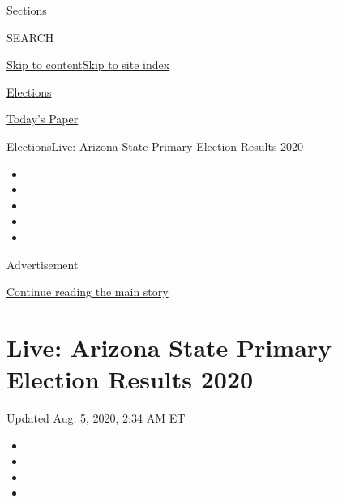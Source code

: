 Sections

SEARCH

\protect\hyperlink{site-content}{Skip to
content}\protect\hyperlink{site-index}{Skip to site index}

\href{https://www.nytimes.com/news-event/2020-election}{Elections}

\href{https://myaccount.nytimes.com/auth/login?response_type=cookie\&client_id=vi}{}

\href{https://www.nytimes.com/section/todayspaper}{Today's Paper}

\href{/news-event/2020-election}{Elections}\textbar{}Live: Arizona State
Primary Election Results 2020

\begin{itemize}
\item
\item
\item
\item
\item
\end{itemize}

Advertisement

\protect\hyperlink{after-top}{Continue reading the main story}

\hypertarget{live-arizona-state-primary-election-results-2020}{%
\section{Live: Arizona State Primary Election Results
2020}\label{live-arizona-state-primary-election-results-2020}}

Updated Aug. 5, 2020, 2:34 AM ET

\begin{itemize}
\item
\item
\item
\item
\end{itemize}

